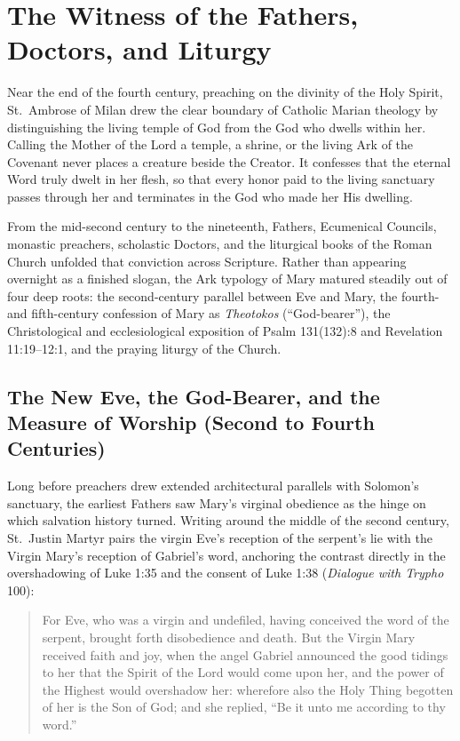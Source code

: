 \section{The Witness of the Fathers, Doctors, and Liturgy}\label{sec:fathers-liturgy}

Near the end of the fourth century, preaching on the divinity of the Holy Spirit, St.\ Ambrose of Milan drew the clear boundary of Catholic Marian theology by distinguishing the living temple of God from the God who dwells within her. Calling the Mother of the Lord a temple, a shrine, or the living Ark of the Covenant never places a creature beside the Creator. It confesses that the eternal Word truly dwelt in her flesh, so that every honor paid to the living sanctuary passes through her and terminates in the God who made her His dwelling.

From the mid-second century to the nineteenth, Fathers, Ecumenical Councils, monastic preachers, scholastic Doctors, and the liturgical books of the Roman Church unfolded that conviction across Scripture. Rather than appearing overnight as a finished slogan, the Ark typology of Mary matured steadily out of four deep roots: the second-century parallel between Eve and Mary, the fourth- and fifth-century confession of Mary as \textit{Theotokos} (``God-bearer''), the Christological and ecclesiological exposition of Psalm 131(132):8 and Revelation 11:19--12:1, and the praying liturgy of the Church.

\subsection{The New Eve, the God-Bearer, and the Measure of Worship (Second to Fourth Centuries)}

Long before preachers drew extended architectural parallels with Solomon's sanctuary, the earliest Fathers saw Mary's virginal obedience as the hinge on which salvation history turned. Writing around the middle of the second century, St.\ Justin Martyr pairs the virgin Eve's reception of the serpent's lie with the Virgin Mary's reception of Gabriel's word, anchoring the contrast directly in the overshadowing of Luke 1:35 and the consent of Luke 1:38 (\textit{Dialogue with Trypho} 100):

\begin{quote}\small
For Eve, who was a virgin and undefiled, having conceived the word of the serpent, brought forth disobedience and death. But the Virgin Mary received faith and joy, when the angel Gabriel announced the good tidings to her that the Spirit of the Lord would come upon her, and the power of the Highest would overshadow her: wherefore also the Holy Thing begotten of her is the Son of God; and she replied, ``Be it unto me according to thy word.''
\end{quote}

